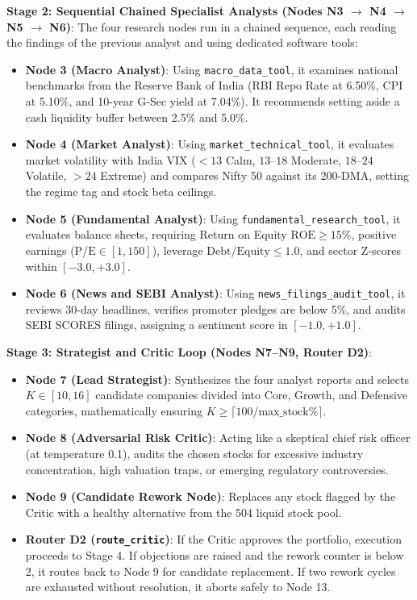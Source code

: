 \noindent \textbf{Stage 2: Sequential Chained Specialist Analysts (Nodes N3 $\to$ N4 $\to$ N5 $\to$ N6)}:
The four research nodes run in a chained sequence, each reading the findings of the previous analyst and using dedicated software tools:
\begin{itemize}
    \item \textbf{Node 3 (Macro Analyst)}: Using \texttt{macro\_data\_tool}, it examines national benchmarks from the Reserve Bank of India (RBI Repo Rate at 6.50\%, CPI at 5.10\%, and 10-year G-Sec yield at 7.04\%). It recommends setting aside a cash liquidity buffer between 2.5\% and 5.0\%.
    \item \textbf{Node 4 (Market Analyst)}: Using \texttt{market\_technical\_tool}, it evaluates market volatility with India VIX ($<13$ Calm, $13\text{--}18$ Moderate, $18\text{--}24$ Volatile, $>24$ Extreme) and compares Nifty 50 against its 200-DMA, setting the regime tag and stock beta ceilings.
    \item \textbf{Node 5 (Fundamental Analyst)}: Using \texttt{fundamental\_research\_tool}, it evaluates balance sheets, requiring Return on Equity $\text{ROE} \ge 15\%$, positive earnings ($\text{P/E} \in [1, 150]$), leverage $\text{Debt/Equity} \le 1.0$, and sector Z-scores within $[-3.0, +3.0]$.
    \item \textbf{Node 6 (News and SEBI Analyst)}: Using \texttt{news\_filings\_audit\_tool}, it reviews 30-day headlines, verifies promoter pledges are below 5\%, and audits SEBI SCORES filings, assigning a sentiment score in $[-1.0, +1.0]$.
\end{itemize}

\noindent \textbf{Stage 3: Strategist and Critic Loop (Nodes N7--N9, Router D2)}:
\begin{itemize}
    \item \textbf{Node 7 (Lead Strategist)}: Synthesizes the four analyst reports and selects $K \in [10, 16]$ candidate companies divided into Core, Growth, and Defensive categories, mathematically ensuring $K \ge \lceil 100 / \text{max\_stock\%} \rceil$.
    \item \textbf{Node 8 (Adversarial Risk Critic)}: Acting like a skeptical chief risk officer (at temperature 0.1), audits the chosen stocks for excessive industry concentration, high valuation traps, or emerging regulatory controversies.
    \item \textbf{Node 9 (Candidate Rework Node)}: Replaces any stock flagged by the Critic with a healthy alternative from the 504 liquid stock pool.
    \item \textbf{Router D2 (\texttt{route\_critic})}: If the Critic approves the portfolio, execution proceeds to Stage 4. If objections are raised and the rework counter is below 2, it routes back to Node 9 for candidate replacement. If two rework cycles are exhausted without resolution, it aborts safely to Node 13.
\end{itemize}


